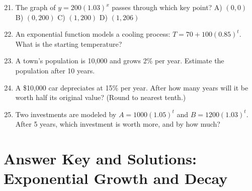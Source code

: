 \documentclass[12pt]{article}
\begin{document}
\begin{enumerate}
  \setcounter{enumi}{20}
  \item The graph of \(y = 200(1.03)^x\) passes through which key point?
  A) \((0, 0)\) \quad B) \((0, 200)\) \quad C) \((1, 200)\) \quad D) \((1, 206)\)

  \item An exponential function models a cooling process: \(T = 70 + 100(0.85)^t.\)  
  What is the starting temperature?

  \item A town’s population is 10,000 and grows 2\% per year.  
  Estimate the population after 10 years.

  \item A \$10,000 car depreciates at 15\% per year.  
  After how many years will it be worth half its original value? (Round to nearest tenth.)

  \item Two investments are modeled by  
  \(A = 1000(1.05)^t\) and \(B = 1200(1.03)^t.\)  
  After 5 years, which investment is worth more, and by how much?
\end{enumerate}

\newpage


\section*{Answer Key and Solutions: Exponential Growth and Decay}
\end{document}
